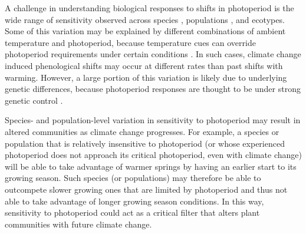 \documentclass{article}
\begin{document}

\par A challenge in understanding biological responses to shifts in photoperiod is the wide range of sensitivity observed across species \citep{Sanz-Perez:2009aa, zohner2016,flynn2018}, populations \citep{tanino2010}, and ecotypes\citep{Howe:1995aa}. Some of this variation may be explained by different combinations of ambient temperature and photoperiod, because temperature cues can override photoperiod requirements under certain conditions \citep [at least during growth cessation][] {tanino2010}. In such cases, climate change induced phenological shifts may occur at different rates than past shifts with warming. However, a large portion of this variation is likely due to underlying genetic differences, because photoperiod responses are thought to be under strong genetic control \cite{bradshaw1995,weih2004,keller2011}. 
\par Species- and population-level variation in sensitivity to photoperiod may result in altered communities as climate change progresses. For example, a species or population that is relatively insensitive to photoperiod (or whose experienced photoperiod does not approach its critical photoperiod, even with climate change) will be able to take advantage of warmer springs by having an earlier start to its growing season. Such species (or populations) may therefore be able to outcompete slower growing ones that are limited by photoperiod and thus not able to take advantage of longer growing season conditions. In this way, sensitivity to photoperiod could act as a critical filter that alters plant communities with future climate change. 
\end{document}
